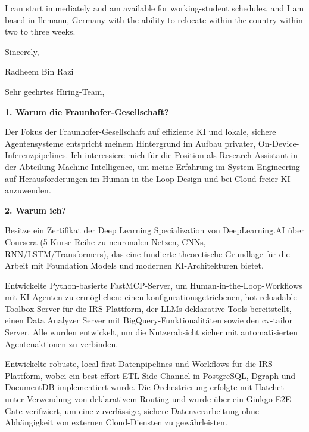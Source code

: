\documentclass[11pt,a4paper]{coverletter}
\begin{document}
\bulletsend

I can start immediately and am available for working-student schedules, and I am based in Ilemanu, Germany with the ability to relocate within the country within two to three weeks.

\closing{Sincerely,}{Radheem Bin Razi}

\clearpage
{}


\opening{Sehr geehrtes Hiring-Team,}

\vspace{8pt}\noindent\textbf{1. Warum die Fraunhofer-Gesellschaft?}\par\vspace{3pt}

Der Fokus der Fraunhofer-Gesellschaft auf effiziente KI und lokale, sichere Agentensysteme entspricht meinem Hintergrund im Aufbau privater, On-Device-Inferenzpipelines. Ich interessiere mich für die Position als Research Assistant in der Abteilung Machine Intelligence, um meine Erfahrung im System Engineering auf Herausforderungen im Human-in-the-Loop-Design und bei Cloud-freier KI anzuwenden.

\vspace{8pt}\noindent\textbf{2. Warum ich?}\par\vspace{3pt}

\bullets

  \item Besitze ein Zertifikat der Deep Learning Specialization von DeepLearning.AI über Coursera (5-Kurse-Reihe zu neuronalen Netzen, CNNs, RNN/LSTM/Transformers), das eine fundierte theoretische Grundlage für die Arbeit mit Foundation Models und modernen KI-Architekturen bietet.

  \item Entwickelte Python-basierte FastMCP-Server, um Human-in-the-Loop-Workflows mit KI-Agenten zu ermöglichen: einen konfigurationsgetriebenen, hot-reloadable Toolbox-Server für die IRS-Plattform, der LLMs deklarative Tools bereitstellt, einen Data Analyzer Server mit BigQuery-Funktionalitäten sowie den cv-tailor Server. Alle wurden entwickelt, um die Nutzerabsicht sicher mit automatisierten Agentenaktionen zu verbinden.

  \item Entwickelte robuste, local-first Datenpipelines und Workflows für die IRS-Plattform, wobei ein best-effort ETL-Side-Channel in PostgreSQL, Dgraph und DocumentDB implementiert wurde. Die Orchestrierung erfolgte mit Hatchet unter Verwendung von deklarativem Routing und wurde über ein Ginkgo E2E Gate verifiziert, um eine zuverlässige, sichere Datenverarbeitung ohne Abhängigkeit von externen Cloud-Diensten zu gewährleisten.
\end{document}
